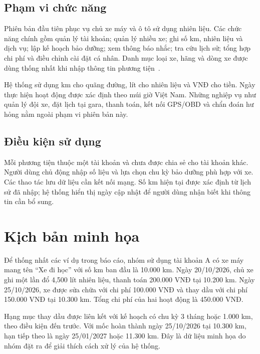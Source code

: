 \subsection{Phạm vi chức năng}
Phiên bản đầu tiên phục vụ chủ xe máy và ô tô sử dụng nhiên liệu. Các chức năng chính gồm quản lý tài khoản; quản lý nhiều xe; ghi số km, nhiên liệu và dịch vụ; lập kế hoạch bảo dưỡng; xem thông báo nhắc; tra cứu lịch sử; tổng hợp chi phí và điều chỉnh cài đặt cá nhân. Danh mục loại xe, hãng và dòng xe được dùng thống nhất khi nhập thông tin phương tiện~\cite{design}.

Hệ thống sử dụng km cho quãng đường, lít cho nhiên liệu và VNĐ cho tiền. Ngày thực hiện hoạt động được xác định theo múi giờ Việt Nam. Những nghiệp vụ như quản lý đội xe, đặt lịch tại gara, thanh toán, kết nối GPS/OBD và chẩn đoán hư hỏng nằm ngoài phạm vi phiên bản này.

\subsection{Điều kiện sử dụng}
Mỗi phương tiện thuộc một tài khoản và chưa được chia sẻ cho tài khoản khác. Người dùng chủ động nhập số liệu và lựa chọn chu kỳ bảo dưỡng phù hợp với xe. Các thao tác lưu dữ liệu cần kết nối mạng. Số km hiện tại được xác định từ lịch sử đã nhập; hệ thống hiển thị ngày cập nhật để người dùng nhận biết khi thông tin cần bổ sung.

\section{Kịch bản minh họa}
Để thống nhất các ví dụ trong báo cáo, nhóm sử dụng tài khoản A có xe máy mang tên \enquote{Xe đi học} với số km ban đầu là 10.000 km. Ngày 20/10/2026, chủ xe ghi một lần đổ 4,500 lít nhiên liệu, thanh toán 200.000 VNĐ tại 10.200 km. Ngày 25/10/2026, xe được sửa chữa với chi phí 100.000 VNĐ và thay dầu với chi phí 150.000 VNĐ tại 10.300 km. Tổng chi phí của hai hoạt động là 450.000 VNĐ.

Hạng mục thay dầu được liên kết với kế hoạch có chu kỳ 3 tháng hoặc 1.000 km, theo điều kiện đến trước. Với mốc hoàn thành ngày 25/10/2026 tại 10.300 km, hạn tiếp theo là ngày 25/01/2027 hoặc 11.300 km. Đây là dữ liệu minh họa do nhóm đặt ra để giải thích cách xử lý của hệ thống.
